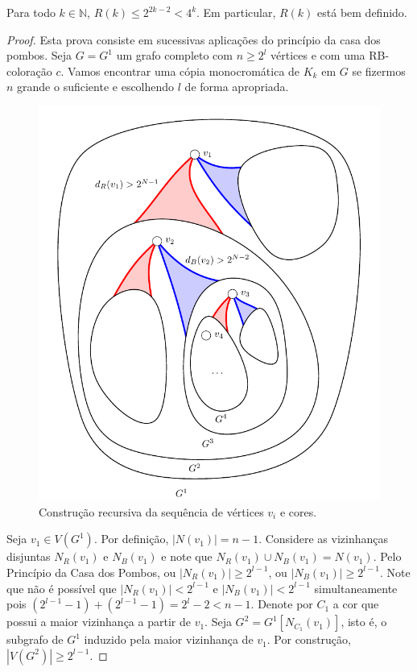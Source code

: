 \begin{theorem}[Ramsey, 1930]
\label{thm:intro:ramsey}
Para todo $k \in \mathbb{N}$, $R(k) \leq 2^{2k-2} < 4^k $. Em particular, $R(k)$ está bem definido.
\end{theorem}
\begin{proof}
Esta prova consiste em sucessivas aplicações do princípio da casa dos pombos. Seja $G = G^1$ um grafo completo com $n \geq 2^{l}$ vértices e com uma RB-coloração $c$. Vamos encontrar uma cópia monocromática de $K_k$ em $G$ se fizermos $n$ grande o suficiente e escolhendo $l$ de forma apropriada.

\begin{figure}[ht!]
\centering
\includegraphics[width=0.75\linewidth]{figures/1_intro_6_recursive}
\caption{Construção recursiva da sequência de vértices $v_i$ e cores.}
\label{fig:intro:recursive}
\end{figure}

Seja $v_1 \in V(G^1)$. Por definição, $|N(v_1)| = n-1$. Considere as vizinhanças disjuntas $N_R(v_1)$ e $N_B(v_1)$ e note que $N_R(v_1) \cup N_B(v_1) = N(v_1)$. Pelo Princípio da Casa dos Pombos, ou $|N_R(v_1)| \geq 2^{l-1}$, ou $|N_B(v_1)| \geq 2^{l-1}$.
Note que não é possível que $|N_R(v_1)| < 2^{l-1}$ e $|N_B(v_1)| < 2^{l-1}$ simultaneamente pois $(2^{l-1} - 1) + (2^{l-1} - 1)  = 2^l - 2 < n - 1$.
Denote por $C_1$ a cor que possui a maior vizinhança a partir de $v_1$. Seja $G^2 = G^1[N_{C_1}(v_1)]$, isto é, o subgrafo de $G^1$ induzido pela maior vizinhança de $v_1$. Por construção, $|V(G^2)| \geq 2^{l - 1}$.


\end{proof}
